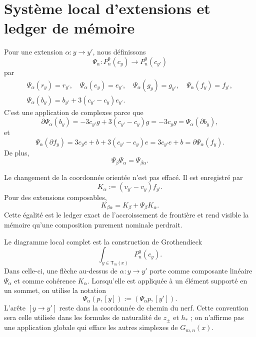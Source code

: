 \section{Système local d'extensions et ledger de mémoire}

Pour une extension \(\alpha:y\to y'\), nous définissons
\begin{equation}\label{eq:detint-psi}
 \Psi_\alpha:P_n^0(c_y)\longrightarrow P_n^0(c_{y'})
\end{equation}
par
\begin{equation}\label{eq:detint-psi-generadores}
\begin{gathered}
 \Psi_\alpha(r_y)=r_{y'},\quad
 \Psi_\alpha(e_y)=e_{y'},\quad
 \Psi_\alpha(g_y)=g_{y'},\quad
 \Psi_\alpha(f_y)=f_{y'},\\
 \Psi_\alpha(b_y)=b_{y'}+3(c_{y'}-c_y)e_{y'}.
\end{gathered}
\end{equation}
C'est une application de complexes parce que
\begin{equation}\label{eq:detint-psi-b-chain}
 \partial\Psi_\alpha(b_y)
 =-3c_{y'}g+3(c_{y'}-c_y)g
 =-3c_yg
 =\Psi_\alpha(\partial b_y),
\end{equation}
et
\begin{equation}\label{eq:detint-psi-f-chain}
 \Psi_\alpha(\partial f_y)
 =3c_ye+b+3(c_{y'}-c_y)e
 =3c_{y'}e+b
 =\partial\Psi_\alpha(f_y).
\end{equation}
De plus,
\begin{equation}\label{eq:detint-psi-functorial}
 \Psi_\beta\Psi_\alpha=\Psi_{\beta\alpha}.
\end{equation}

Le changement de la coordonnée orientée n'est pas effacé. Il est enregistré par
\begin{equation}\label{eq:detint-k-alpha}
 K_\alpha:=(v_{y'}-v_y)f_{y'}.
\end{equation}
Pour des extensions composables,
\begin{equation}\label{eq:detint-k-coherencia}
 K_{\beta\alpha}=K_\beta+\Psi_\beta K_\alpha.
\end{equation}
Cette égalité est le ledger exact de l'accroissement de frontière et rend visible
la mémoire qu'une composition purement nominale perdrait.

Le diagramme local complet est la construction de Grothendieck
\begin{equation}\label{eq:detint-grothendieck-local}
 \int_{y\in\mathsf T_m(x)}P_n^0(c_y).
\end{equation}
Dans celle-ci, une flèche au-dessus de \(\alpha:y\to y'\) porte comme composante linéaire
\(\Psi_\alpha\) et comme cohérence \(K_\alpha\). Lorsqu'elle est appliquée à un
élément supporté en un sommet, on utilise la notation
\begin{equation}\label{eq:detint-psi-soporte-vertice}
 \Psi_\alpha(p,[y]):=(\Psi_\alpha p,[y']).
\end{equation}
L'arête \([y\to y']\) reste dans la coordonnée de chemin du nerf. Cette
convention sera celle utilisée dans les formules de naturalité de
\(z_\pm\) et \(h_*\) ; on n'affirme pas une application globale qui efface les autres
simplexes de \(G_{m,n}(x)\).

